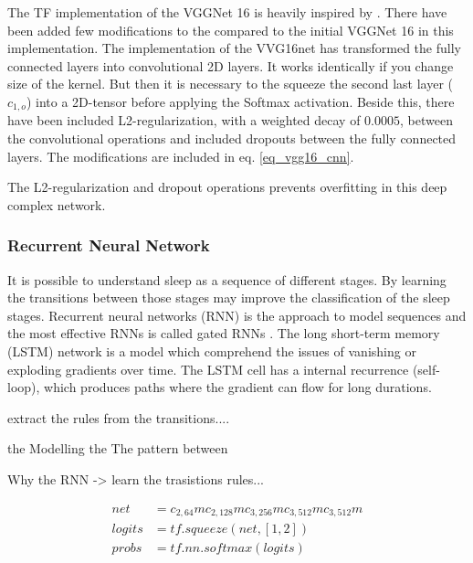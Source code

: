 The TF implementation of the VGGNet 16 is heavily inspired by \cite{git_vgg16}. There have been added few modifications to the compared to the initial VGGNet 16 \cite{VGGnet16} in this implementation. 
The implementation of the VVG16net has transformed the fully connected layers into convolutional 2D layers. It works identically if you change size of the kernel. But then it is necessary to the squeeze the second last layer ($c_{1,o}$) into a 2D-tensor before applying the Softmax activation.
Beside this, there have been included L2-regularization, with a weighted decay of $0.0005$, between the convolutional operations and included dropouts between the fully connected layers. The modifications are included in eq. \ref{eq_vgg16_cnn}.
  
 The L2-regularization and dropout operations prevents overfitting in this deep complex network. 

\subsubsection{Recurrent Neural Network}


It is possible to understand sleep as a sequence of different stages. By learning the transitions between those stages may improve the classification of the sleep stages.
Recurrent neural networks (RNN) is the approach to model sequences and the most effective RNNs is called gated RNNs \cite[sec. 10.10]{dl_book}. 
The long short-term memory (LSTM) network is a model which comprehend the issues of vanishing or exploding gradients over time. The LSTM cell has a internal recurrence (self-loop), which produces paths where the gradient can flow for long durations.  



extract the rules from the transitions....


the Modelling the The pattern between 


Why the RNN -> learn the trasistions rules... 


\begin{equation}
\begin{aligned}
net &= c_{2,64}mc_{2,128}mc_{3,256}mc_{3,512}mc_{3,512}m \\%
logits &= tf.squeeze(net, [1, 2])\\
probs &= tf.nn.softmax(logits)
\end{aligned}
\label{eq_vgg16_rnn}
\end{equation}

